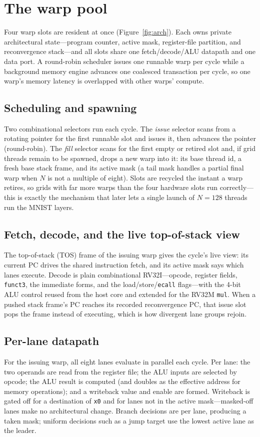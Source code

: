 \documentclass[12pt,a4paper,oneside]{report}
\newcommand{\code}[1]{\texttt{#1}}
\begin{document}
\section{The warp pool}
Four warp slots are resident at once (Figure~\ref{fig:arch}). Each owns private
architectural state---program counter, active mask, register-file partition, and
reconvergence stack---and all slots share one fetch/decode/ALU datapath and one
data port. A round-robin scheduler issues one runnable warp per cycle while a
background memory engine advances one coalesced transaction per cycle, so one
warp's memory latency is overlapped with other warps' compute.

\subsection{Scheduling and spawning}
Two combinational selectors run each cycle. The \emph{issue} selector scans from a
rotating pointer for the first runnable slot and issues it, then advances the
pointer (round-robin). The \emph{fill} selector scans for the first empty or
retired slot and, if grid threads remain to be spawned, drops a new warp into it:
its base thread id, a fresh base stack frame, and its active mask (a tail mask
handles a partial final warp when $N$ is not a multiple of eight). Slots are
recycled the instant a warp retires, so grids with far more warps than the four
hardware slots run correctly---this is exactly the mechanism that later lets a
single launch of $N=128$ threads run the MNIST layers.

\subsection{Fetch, decode, and the live top-of-stack view}
The top-of-stack (TOS) frame of the issuing warp gives the cycle's live view: its
current PC drives the shared instruction fetch, and its active mask says which
lanes execute. Decode is plain combinational RV32I---opcode, register fields,
\code{funct3}, the immediate forms, and the load/store/\code{ecall} flags---with
the 4-bit ALU control reused from the host core and extended for the RV32M
\code{mul}. When a pushed stack frame's PC reaches its recorded reconvergence PC,
that issue slot pops the frame instead of executing, which is how divergent lane
groups rejoin.

\subsection{Per-lane datapath}
For the issuing warp, all eight lanes evaluate in parallel each cycle. Per lane:
the two operands are read from the register file; the ALU inputs are selected by
opcode; the ALU result is computed (and doubles as the effective address for
memory operations); and a writeback value and enable are formed. Writeback is
gated off for a destination of \code{x0} and for lanes not in the active
mask---masked-off lanes make no architectural change. Branch decisions are per
lane, producing a taken mask; uniform decisions such as a jump target use the
lowest active lane as the leader.
\end{document}
